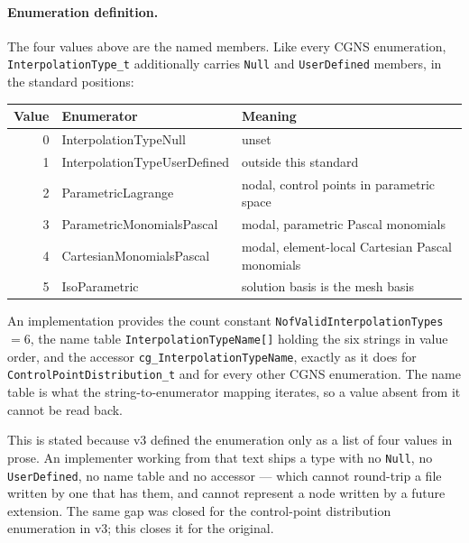 \documentclass[11pt,letterpaper]{article}
\newif\ifvfourdraft
\newenvironment{v4block}{\ifvfourdraft\color{v4violet}\fi\ignorespaces}{\par}
\newcommand{\vfourmark}{\ifvfourdraft\textcolor{v4violet}{\textbf{[v4]}}\ \fi}
\begin{document}
\begin{v4block}
\paragraph{\vfourmark Enumeration definition.}
\label{sec:interpolation-type-enum}
The four values above are the named members.  Like every CGNS enumeration,
\texttt{InterpolationType\_t} additionally carries \texttt{Null} and
\texttt{UserDefined} members, in the standard positions:

\smallskip
\begin{tabular}{@{}r >{\ttfamily}l l@{}}
\toprule
\textbf{Value} & \normalfont\textbf{Enumerator} & \textbf{Meaning} \\
\midrule
0 & InterpolationTypeNull        & unset \\
1 & InterpolationTypeUserDefined & outside this standard \\
2 & ParametricLagrange           & nodal, control points in parametric space \\
3 & ParametricMonomialsPascal    & modal, parametric Pascal monomials \\
4 & CartesianMonomialsPascal     & modal, element-local Cartesian Pascal monomials \\
5 & IsoParametric                & solution basis is the mesh basis \\
\bottomrule
\end{tabular}

\smallskip
\noindent An implementation provides the count constant
\texttt{NofValidInterpolationTypes} $= 6$, the name table
\texttt{InterpolationTypeName[]} holding the six strings in value order, and the
accessor \texttt{cg\_InterpolationTypeName}, exactly as it does for
\texttt{ControlPointDistribution\_t} and for every other CGNS enumeration.  The
name table is what the string-to-enumerator mapping iterates, so a value absent
from it cannot be read back.

This is stated because v3 defined the enumeration only as a list of four values in
prose.  An implementer working from that text ships a type with no \texttt{Null},
no \texttt{UserDefined}, no name table and no accessor --- which cannot round-trip
a file written by one that has them, and cannot represent a node written by a
future extension.  The same gap was closed for the control-point distribution
enumeration in v3; this closes it for the original.
\end{v4block}

\end{document}
